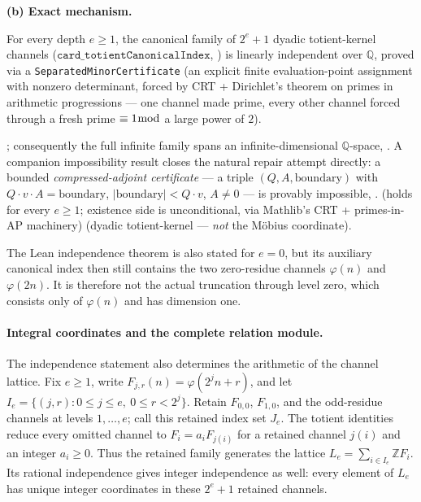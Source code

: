 \textbf{(b) Exact mechanism.}
\begin{thm}
For every depth \(e\ge1\), the canonical family of \(2^e+1\) dyadic
totient-kernel channels (\(\mathtt{card\_totientCanonicalIndex}\),
) is linearly independent over
\(\mathbb Q\), proved via a \texttt{SeparatedMinorCertificate} (an explicit
finite evaluation-point assignment with nonzero determinant, forced by CRT +
Dirichlet's theorem on primes in arithmetic progressions — one channel made
prime, every other channel forced through a fresh prime \(\equiv1\bmod\) a
large power of \(2\)).
\end{thm}
; consequently the full
infinite family spans an infinite-dimensional \(\mathbb Q\)-space,
. A companion
impossibility result closes the natural repair attempt directly: a bounded
\emph{compressed-adjoint certificate} — a triple \((Q,A,\mathrm{boundary})\)
with \(Q\cdot v\cdot A=\mathrm{boundary}\), \(|\mathrm{boundary}|<Q\cdot v\),
\(A\ne0\) — is provably impossible,
. 
 (holds for every \(e\ge1\); existence side is unconditional, via
Mathlib's CRT + primes-in-AP machinery)  (dyadic
totient-kernel — \emph{not} the Möbius coordinate).

The Lean independence theorem is also stated for \(e=0\), but its auxiliary
canonical index then still contains the two zero-residue channels
\(\varphi(n)\) and \(\varphi(2n)\).  It is therefore not the actual truncation
through level zero, which consists only of \(\varphi(n)\) and has dimension one.

\paragraph{Integral coordinates and the complete relation module.}
The independence statement also determines the arithmetic of the channel
lattice.  Fix $e\ge1$, write $F_{j,r}(n)=\varphi(2^j n+r)$, and let
$I_e=\{(j,r):0\le j\le e,\ 0\le r<2^j\}$.  Retain $F_{0,0}$,
$F_{1,0}$, and the odd-residue channels at levels $1,\ldots,e$; call
this retained index set $J_e$.  The totient identities reduce every omitted
channel to $F_i=a_iF_{j(i)}$ for a retained channel $j(i)$ and an integer
$a_i\ge0$.  Thus the retained family generates the lattice
$L_e=\sum_{i\in I_e}\mathbb Z F_i$.  Its rational independence gives
integer independence as well: every element of $L_e$ has unique integer
coordinates in these $2^e+1$ retained channels.


